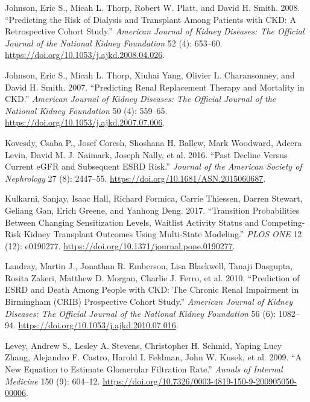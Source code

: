 \documentclass[
]{article}
\newlength{\cslhangindent}
\newenvironment{cslreferences}%
  {\setlength{\parindent}{0pt}%
  \everypar{\setlength{\hangindent}{\cslhangindent}}\ignorespaces}%
  {\par}
\begin{document}
\begin{cslreferences}
\leavevmode\hypertarget{ref-johnson_predicting_2008}{}%
Johnson, Eric S., Micah L. Thorp, Robert W. Platt, and David H. Smith. 2008. ``Predicting the Risk of Dialysis and Transplant Among Patients with CKD: A Retrospective Cohort Study.'' \emph{American Journal of Kidney Diseases: The Official Journal of the National Kidney Foundation} 52 (4): 653--60. \url{https://doi.org/10.1053/j.ajkd.2008.04.026}.

\leavevmode\hypertarget{ref-johnson_predicting_2007}{}%
Johnson, Eric S., Micah L. Thorp, Xiuhai Yang, Olivier L. Charansonney, and David H. Smith. 2007. ``Predicting Renal Replacement Therapy and Mortality in CKD.'' \emph{American Journal of Kidney Diseases: The Official Journal of the National Kidney Foundation} 50 (4): 559--65. \url{https://doi.org/10.1053/j.ajkd.2007.07.006}.

\leavevmode\hypertarget{ref-kovesdy_past_2016}{}%
Kovesdy, Csaba P., Josef Coresh, Shoshana H. Ballew, Mark Woodward, Adeera Levin, David M. J. Naimark, Joseph Nally, et al. 2016. ``Past Decline Versus Current eGFR and Subsequent ESRD Risk.'' \emph{Journal of the American Society of Nephrology} 27 (8): 2447--55. \url{https://doi.org/10.1681/ASN.2015060687}.

\leavevmode\hypertarget{ref-kulkarni_transition_2017}{}%
Kulkarni, Sanjay, Isaac Hall, Richard Formica, Carrie Thiessen, Darren Stewart, Geliang Gan, Erich Greene, and Yanhong Deng. 2017. ``Transition Probabilities Between Changing Sensitization Levels, Waitlist Activity Status and Competing-Risk Kidney Transplant Outcomes Using Multi-State Modeling.'' \emph{PLOS ONE} 12 (12): e0190277. \url{https://doi.org/10.1371/journal.pone.0190277}.

\leavevmode\hypertarget{ref-landray_prediction_2010}{}%
Landray, Martin J., Jonathan R. Emberson, Lisa Blackwell, Tanaji Dasgupta, Rosita Zakeri, Matthew D. Morgan, Charlie J. Ferro, et al. 2010. ``Prediction of ESRD and Death Among People with CKD: The Chronic Renal Impairment in Birmingham (CRIB) Prospective Cohort Study.'' \emph{American Journal of Kidney Diseases: The Official Journal of the National Kidney Foundation} 56 (6): 1082--94. \url{https://doi.org/10.1053/j.ajkd.2010.07.016}.

\leavevmode\hypertarget{ref-levey_new_2009}{}%
Levey, Andrew S., Lesley A. Stevens, Christopher H. Schmid, Yaping Lucy Zhang, Alejandro F. Castro, Harold I. Feldman, John W. Kusek, et al. 2009. ``A New Equation to Estimate Glomerular Filtration Rate.'' \emph{Annals of Internal Medicine} 150 (9): 604--12. \url{https://doi.org/10.7326/0003-4819-150-9-200905050-00006}.


\end{cslreferences}
\end{document}
